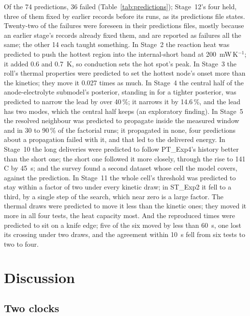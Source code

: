 \documentclass[preprint,12pt]{elsarticle}
\newcommand{\degC}{\,\textdegree C}
\newcommand{\PH}[1]{\textcolor{red}{[#1]}}
\begin{document}
Of the 74 predictions, 36 failed (Table~\ref{tab:predictions}); Stage~12's four held, three of them fixed by earlier records before its runs, as its predictions file states. Twenty-two of the failures were foreseen in their predictions files, mostly because an earlier stage's records already fixed them, and are reported as failures all the same; the other 14 each taught something. In Stage~2 the reaction heat was predicted to push the hottest region into the internal-short band at 200~mW\,K$^{-1}$; it added 0.6 and 0.7~K, so conduction sets the hot spot's peak. In Stage~3 the roll's thermal properties were predicted to set the hottest node's onset more than the kinetics; they move it 0.027 times as much. In Stage~4 the central half of the anode-electrolyte submodel's posterior, standing in for a tighter posterior, was predicted to narrow the lead by over 40\,\%; it narrows it by 14.6\,\%, and the lead has two modes, which the central half keeps (an exploratory finding). In Stage~5 the resolved neighbour was predicted to propagate inside the measured window and in 30 to 90\,\% of the factorial runs; it propagated in none, four predictions about a propagation failed with it, and that led to the delivered energy. In Stage~10 the long deliveries were predicted to follow PT\_Exp4's history better than the short one; the short one followed it more closely, through the rise to 141\degC{} by 45~s; and the survey found a second dataset whose cell the model covers, against the prediction. In Stage~11 the whole cell's threshold was predicted to stay within a factor of two under every kinetic draw; in ST\_Exp2 it fell to a third, by a single step of the search, which near zero is a large factor. The thermal draws were predicted to move it less than the kinetic ones; they moved it more in all four tests, the heat capacity most. And the reproduced times were predicted to sit on a knife edge; five of the six moved by less than 60~s, one lost its crossing under two draws, and the agreement within 10~s fell from six tests to two to four.


\IfFileExists{tables/t4_predictions.tex}{}{\PH{table pending}}

\section{Discussion}
\label{sec:discussion}

\subsection{Two clocks}
\label{sec:disc-clocks}
\end{document}
